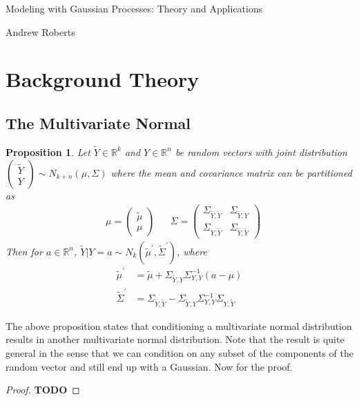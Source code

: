 \documentclass[12pt]{article}
\newcommand{\R}{\mathcal{R}}
\def\R{\mathbb{R}}
\newtheorem{prop}{Proposition}
\begin{document}
\begin{center}
\Large
Modeling with Gaussian Processes: Theory and Applications
\end{center}

\begin{flushright}
Andrew Roberts
\end{flushright} 

\section{Background Theory}

\subsection{The Multivariate Normal} \label{mvn_conditioning}
\begin{prop}
Let $\tilde{Y} \in \R^k$ and $Y \in \R^n$ be random vectors with joint distribution $\begin{pmatrix} \tilde{Y} \\ Y \end{pmatrix} \sim N_{k + n}\left(\mu, \Sigma \right)$
where the mean and covariance matrix can be partitioned as 
\begin{align*}
&\mu = \begin{pmatrix} \tilde{\mu} \\ \mu \end{pmatrix} && \Sigma = \begin{pmatrix} \Sigma_{\tilde{Y}, \tilde{Y}} & \Sigma_{\tilde{Y}, Y} \\ \Sigma_{Y, \tilde{Y}} & \Sigma_{\tilde{Y}, \tilde{Y}}  \end{pmatrix} 
\end{align*}
Then for $a \in \R^n$, $\tilde{Y}|Y = a \sim N_k\left(\tilde{\mu}^\prime, \tilde{\Sigma}^\prime \right)$, where 
\begin{align*}
\tilde{\mu}^\prime &= \tilde{\mu} + \Sigma_{\tilde{Y}, Y} \Sigma_{Y, Y}^{-1}(a - \mu) \\
\tilde{\Sigma}^\prime &= \Sigma_{\tilde{Y}, \tilde{Y}} -  \Sigma_{\tilde{Y}, Y} \Sigma_{Y, Y}^{-1} \Sigma_{Y, \tilde{Y}}
\end{align*}
\end{prop}

The above proposition states that conditioning a multivariate normal distribution results in another multivariate normal distribution. Note that 
the result is quite general in the sense that we can condition on any subset of the components of the random vector and still end up with a 
Gaussian. Now for the proof. 
\begin{proof}
\textbf{TODO}
\end{proof}
\end{document}
